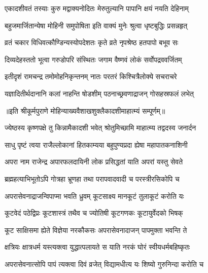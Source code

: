 \twolineshloka
{एकादशीवतं तस्याः कुरु मद्वाक्यनोदितः}
{मेरुतुल्यानि पापानि क्षयं नयति देहिनाम्} %

\twolineshloka
{बहुजमार्जितान्येषा मोहिनी समुपोषिता}
{इति वाक्यं मुनेः श्रुत्वा धृष्टबुद्धिः प्रसन्नहृत्} %

\twolineshloka
{व्रतं चकार विधिवत्कौण्डिन्यस्योपदेशतः}
{कृते व्रते नृपश्रेष्ठ हतपापो बभूव सः} %

\twolineshloka
{दिव्यदेहस्ततो भूत्वा गरुडोपरि संस्थितः}
{जगाम वैष्णवं लोकं सर्वोपद्रववर्जितम्} %

\twolineshloka
{इतीदृशं रामचन्द्र तमोमोहनिकृन्तनम्}
{नातः परतरं किश्चित्रैलोक्ये सचराचरे} %

\twolineshloka
{यज्ञादितीर्थदानानि कलां नाहन्ति षोडशीम्}
{पठनाच्छ्रवणाद्राजन् गोसहस्रफलं लभेत्} %

॥इति श्रीकूर्मपुराणे मोहिन्याख्यवैशाखशुक्लैकादशीमाहात्म्यं सम्पूर्णम्॥


\hyperref[sec:ekadashi_mahatmyam_vrata_raja]{\closesub}
\clearpage

\label{sec:vrata-raja-jyeshtha-krishnapara}


\twolineshloka
{ज्येष्ठस्य कृष्णपक्षे तु किन्नामैकादशी भवेत्}
{श्रोतुमिच्छामि माहात्म्य तद्वदस्व जनार्दन} %


\twolineshloka
{साधु पृष्टं त्वया राजैल्लोकानां हितकाम्यया}
{बहुपुण्यप्रदा ह्येषा महापातकनाशिनी} %

\twolineshloka
{अपरा नाम राजेन्द्र अपारफलदायिनी}
{लोक प्रसिद्धतां याति अपरां यस्तु सेवते} %

\twolineshloka
{ब्रह्महत्याभिभूतोऽपि गोत्रहा भ्रूणहा तथा}
{परापवादवादी च परस्त्रीरसिकोपि च} %

\twolineshloka
{अपरासेवनाद्राजन्विपाप्मा भवति ध्रुवम्}
{कूटसाक्ष्य मानकूटं तुलाकूटं करोति यः} %

\twolineshloka
{कूटवेदं पठेद्विप्रः कूटशास्त्रं तथैव च}
{ज्योतिषी कूटगणकः कूटायुर्वेदको भिषक्} %

\twolineshloka
{कूट साक्षिसमा ह्येते विज्ञेया नरकौकसः}
{अपरासेवनादाजन् पापमुक्ता भवन्ति ते} %

\twolineshloka
{क्षत्रियः क्षात्रधर्म यस्त्यक्त्वा युद्धात्पलायते}
{स याति नरकं घोरं स्वीयधर्मबहिष्कृतः} %

\twolineshloka
{अपरासेवनात्सोपि पापं त्यक्त्वा दिवं व्रजेत्}
{विद्यामधीत्य यः शिष्यो गुरुनिन्दा करोति च} %

